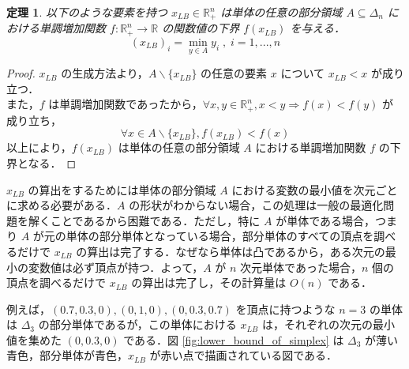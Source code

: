 \documentclass[a4paper,11pt]{jreport}
\newtheorem{theorem}{定理}
\begin{document}
\begin{theorem}\label{thm:lower_bound_of_monotonic_function}
以下のような要素を持つ $ x_{LB} \in \mathbb{R}^n_{+} $ は単体の任意の部分領域 $ A \subseteq \Delta_n $ における単調増加関数 $ f :  \mathbb{R}^n_{+} \to \mathbb{R} $ の関数値の下界 $ f(x_{LB}) $ を与える．
$$ (x_{LB})_i = \min_{y \in A } y_i \; , \; i = 1, ..., n $$
\end{theorem}

\begin{proof}
$ x_{LB} $ の生成方法より，$ A \backslash \{ x_{LB} \} $ の任意の要素 $ x $ について $ x_{LB} < x $ が成り立つ．\\
また，$ f $ は単調増加関数であったから，$ \forall x, y \in \mathbb{R}^n_{+}, x < y \Rightarrow f(x) < f(y) $ が成り立ち，
$$ \forall x \in A \backslash \{ x_{LB} \}, f(x_{LB}) < f(x) $$
以上により，$ f(x_{LB}) $ は単体の任意の部分領域 $ A $ における単調増加関数 $ f $ の下界となる．
\end{proof}

$ x_{LB} $ の算出をするためには単体の部分領域 $ A $ における変数の最小値を次元ごとに求める必要がある．$ A $ の形状がわからない場合，この処理は一般の最適化問題を解くことであるから困難である．ただし，特に $ A $ が単体である場合，つまり $ A $ が元の単体の部分単体となっている場合，部分単体のすべての頂点を調べるだけで $ x_{LB} $ の算出は完了する．なぜなら単体は凸であるから，ある次元の最小の変数値は必ず頂点が持つ．よって，$ A $ が $ n $ 次元単体であった場合，$ n $ 個の頂点を調べるだけで $ x_{LB} $ の算出は完了し，その計算量は $ O(n) $ である． \par
例えば，$ (0.7, 0.3, 0), (0, 1, 0), (0, 0.3, 0.7) $ を頂点に持つような $ n = 3 $ の単体は $ \Delta_3 $ の部分単体であるが，この単体における $ x_{LB} $ は，それぞれの次元の最小値を集めた $ (0, 0.3, 0) $ である．図 \ref{fig:lower_bound_of_simplex} は $ \Delta_3 $ が薄い青色，部分単体が青色，$ x_{LB} $ が赤い点で描画されている図である．\par
\end{document}
